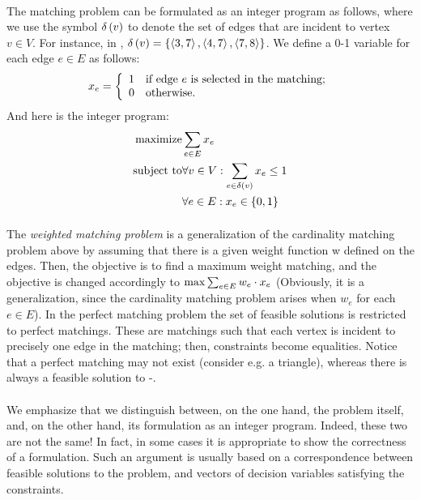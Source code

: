\documentclass[titlepage]{book}
\makeatletter
\newcommand{\concept}[1]{\toindex{#1}\indexlayout{#1}}
\newcommand{\indexlayout}[1]{\emph{#1}}
\newcommand\toindex{\@ifstar{\@dblarg{\@toindexs}}{\@toindex}}
\def\@toindexs[#1]#2{\index{#1@#2}}
\newcommand\@toindex[2][]{%
  \if\relax\detokenize{#1}\relax
    \begingroup
    \@splitword#2\@nil%
    \uppercase\expandafter{%
      \expandafter\def\expandafter\@initial\expandafter{\@first}}%
    \toks0=\expandafter{\@initial}%
    \toks2=\expandafter{\@rest}%
    \edef\x{\endgroup\noexpand\index{\the\toks0 \the\toks2 }}\x
  \else
    \index{#1}
  \fi
}
\def\@splitword#1#2\@nil{\def\@first{#1}\def\@rest{#2}}
\theoremstyle{plain}
\theoremstyle{definition}
\theoremstyle{remark}
\makeatother
\begin{document}
\paragraph{}
The matching problem can be formulated as an integer program as follows, where we use the symbol $\fun{\delta}{v}$ to denote the set of edges that are incident to vertex $v\in V$. For instance, in , $\fun{\delta}{v}=\accl{\tupl{3,7},\tupl{4,7},\tupl{7,8}}$. We define a 0-1 variable for each edge $e\in E$ as follows:
\begin{equation}
\semboolvar{x_e}{if edge $e$ is selected in the matching;}{otherwise.}
\end{equation}
And here is the integer program:
\begin{eqnarray}
\mbox{maximize}&\sumdomain[e]{E}{x_e}\eqnlab{matching-m}\\
\mbox{subject to}&\forall v\in V:\sumdomain[e]{\fun{\delta}{v}}{x_e}\leq 1\eqnlab{matching-c1}\\
&\forall e\in E:x_e\in\accl{0,1}\eqnlab{matching-c2}
\end{eqnarray}

\paragraph{}
The \concept{weighted matching problem} is a generalization of the cardinality matching problem above by assuming that there is a given weight function w defined on the edges. Then, the objective is to find a maximum weight matching, and the objective is changed accordingly to $\max\isumdomain[e]{E}{w_e\cdot x_e}$ (Obviously, it is a generalization, since the cardinality matching problem arises when $w_e$ for each $e\in E$). In the perfect matching problem the set of feasible solutions is restricted to perfect matchings. These are matchings such that each vertex is incident to precisely one edge in the matching; then, constraints  become equalities. Notice that a perfect matching may not exist (consider e.g. a triangle), whereas there is always a feasible solution to -.

\paragraph{}
We emphasize that we distinguish between, on the one hand, the problem itself, and, on the other hand, its formulation as an integer program. Indeed, these two are not the same! In fact, in some cases it is appropriate to show the correctness of a formulation. Such an argument is usually based on a correspondence between feasible solutions to the problem, and vectors of decision variables satisfying the constraints.
\end{document}
